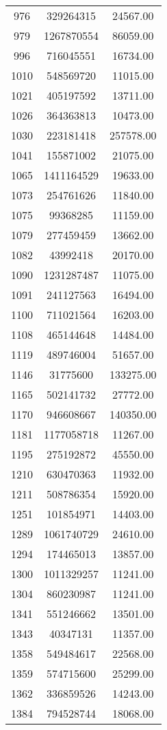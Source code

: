 \begin{centering}
\begin{supertabular}{|c|c|c|}
  976 & 329264315 & 24567.00 \\ 
  979 & 1267870554 & 86059.00 \\ 
  996 & 716045551 & 16734.00 \\ 
  1010 & 548569720 & 11015.00 \\ 
  1021 & 405197592 & 13711.00 \\ 
  1026 & 364363813 & 10473.00 \\ 
  1030 & 223181418 & 257578.00 \\ 
  1041 & 155871002 & 21075.00 \\ 
  1065 & 1411164529 & 19633.00 \\ 
  1073 & 254761626 & 11840.00 \\ 
  1075 & 99368285 & 11159.00 \\ 
  1079 & 277459459 & 13662.00 \\ 
  1082 & 43992418 & 20170.00 \\ 
  1090 & 1231287487 & 11075.00 \\ 
  1091 & 241127563 & 16494.00 \\ 
  1100 & 711021564 & 16203.00 \\ 
  1108 & 465144648 & 14484.00 \\ 
  1119 & 489746004 & 51657.00 \\ 
  1146 & 31775600 & 133275.00 \\ 
  1165 & 502141732 & 27772.00 \\ 
  1170 & 946608667 & 140350.00 \\ 
  1181 & 1177058718 & 11267.00 \\ 
  1195 & 275192872 & 45550.00 \\ 
  1210 & 630470363 & 11932.00 \\ 
  1211 & 508786354 & 15920.00 \\ 
  1251 & 101854971 & 14403.00 \\ 
  1289 & 1061740729 & 24610.00 \\ 
  1294 & 174465013 & 13857.00 \\ 
  1300 & 1011329257 & 11241.00 \\ 
  1304 & 860230987 & 11241.00 \\ 
  1341 & 551246662 & 13501.00 \\ 
  1343 & 40347131 & 11357.00 \\ 
  1358 & 549484617 & 22568.00 \\ 
  1359 & 574715600 & 25299.00 \\ 
  1362 & 336859526 & 14243.00 \\ 
  1384 & 794528744 & 18068.00 \\ 

\end{supertabular}
\end{centering}
